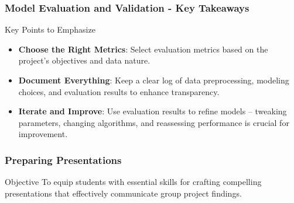 \documentclass[aspectratio=169]{beamer}
\begin{document}
\begin{frame}[fragile]
    \frametitle{Model Evaluation and Validation - Key Takeaways}
    \begin{block}{Key Points to Emphasize}
        \begin{itemize}
            \item \textbf{Choose the Right Metrics}: Select evaluation metrics based on the project's objectives and data nature.
            \item \textbf{Document Everything}: Keep a clear log of data preprocessing, modeling choices, and evaluation results to enhance transparency.
            \item \textbf{Iterate and Improve}: Use evaluation results to refine models – tweaking parameters, changing algorithms, and reassessing performance is crucial for improvement.
        \end{itemize}
    \end{block}
\end{frame}

\begin{frame}[fragile]
    \frametitle{Preparing Presentations}
    \begin{block}{Objective}
        To equip students with essential skills for crafting compelling presentations that effectively communicate group project findings.
    \end{block}
\end{frame}
\end{document}
